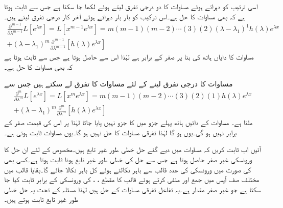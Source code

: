 اسی ترتیب کو دہراتے ہوئے مساوات  کا دو درجی تفرق لیتے ہوئے  لکھا جا سکتا ہے جس سے ثابت ہوتا ہے کہ  بھی مساوات  کا حل ہے۔اس ترکیب کو بار بار دہراتے ہوئے آخر کار  درجی تفرق لیتے ہیں۔
\begin{multline}\label{مساوات_سادہ_بلند_متعدد_گنا_جذر_ٹ}
\frac{\partial^{\, m-1} }{\partial \lambda^{m-1}} L[e^{\lambda x}]=L[x^{m-1}e^{\lambda x}]=m(m-1)(m-2)\cdots (3)(2)(\lambda-\lambda_1)^{1}h(\lambda)e^{\lambda x}\\
+(\lambda-\lambda_1)^m \frac{\partial^{\, m-1}}{\partial \lambda^{m-1}}[h(\lambda)e^{\lambda x}]
\end{multline}
مساوات کا دایاں ہاتھ  کی بنا  پر صفر کے برابر ہے لہٰذا اس سے  حاصل ہوتا ہے جس سے ثابت ہوتا ہے کہ  بھی مساوات  کا حل ہے۔

مساوات  کا  درجی تفرق لینے کے لئے مساوات  کا تفرق لے سکتے ہیں جس سے
\begin{multline*}
\frac{\partial^m }{\partial \lambda^m} L[e^{\lambda x}]=L[x^me^{\lambda x}]=m(m-1)(m-2)\cdots (3)(2)(1)h(\lambda)e^{\lambda x}\\
+(\lambda-\lambda_1)^m \frac{\partial^m}{\partial \lambda^m}[h(\lambda)e^{\lambda x}]
\end{multline*}
ملتا ہے۔ مساوات کے دائیں ہاتھ پہلے جزو میں  کا جزو نہیں پایا جاتا لہٰذا  پر اس کی قیمت صفر کے برابر نہیں ہو گی۔یوں  ہو گا لہٰذا  تفرقی مساوات  کا حل نہیں ہو گا۔یوں مساوات  ثابت ہوتی ہے۔

آئیں اب ثابت کریں کہ مساوات  میں دیے گئے حل خطی طور غیر تابع ہیں۔مخصوص  کے لئے ان حل کا ورونسکی غیر صفر حاصل ہوتا ہے جس سے حل کی خطی طور غیر تابع ہونا ثابت ہوتا ہے۔کسی بھی  کی صورت میں ورونسکی کی  عدد  قالب سے  باہر نکالتے ہوئے  کل  باہر نکالا جائے گا۔بقایا قالب میں مختلف صف آپس میں جمع اور منفی کرتے ہوئے قالب کا مقطع  ، ،   کی ورونسکی کے برابر ثابت کیا  جا سکتا ہے جو غیر صفر مقدار ہے۔یہ تفاعل تفرقی مساوات  کے حل ہیں لہٰذا مسئلہ  کے تحت یہ حل خطی طور غیر تابع ثابت ہوتے ہیں۔


